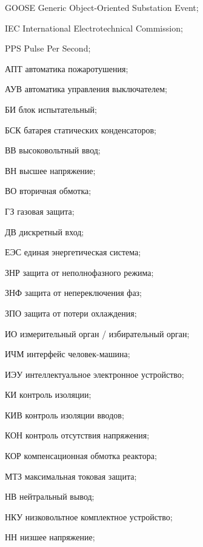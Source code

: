 \begin{list}{}%
{%
  \setlength{\labelwidth}{\abbrwidth}%
  \setlength{\labelsep}{0pt}%
  \setlength{\leftmargin}{\dimexpr\labelwidth+\labelsep\relax}%
  \setlength{\itemindent}{0pt}%
  \setlength{\parsep}{0pt}%
  \setlength{\itemsep}{0pt}
  \renewcommand{\makelabel}[1]{#1 --\hspace{\abbrgap}}%
}
\item[GOOSE] Generic Object-Oriented Substation Event;
\item[IEC]  International Electrotechnical Commission;
\item[PPS] Pulse Per Second;
\item[АПТ] автоматика пожаротушения;
\item[АУВ] автоматика управления выключателем;
\item[БИ] блок испытательный;
\item[БСК] батарея статических конденсаторов;
\item[ВВ] высоковольтный ввод;
\item[ВН] высшее напряжение;
\item[ВО] вторичная обмотка;
\item[ГЗ] газовая защита;
\item[ДВ] дискретный вход;
\item[ЕЭС] единая энергетическая система;
\item[ЗНР] защита от неполнофазного режима;
\item[ЗНФ] защита от непереключения фаз;
\item[ЗПО] защита от потери охлаждения;
\item[ИО] измерительный орган / избирательный орган;
\item[ИЧМ] интерфейс человек-машина;
\item[ИЭУ] интеллектуальное электронное устройство;
\item[КИ] контроль изоляции;
\item[КИВ] контроль изоляции вводов;
\item[КОН] контроль отсутствия напряжения;
\item[КОР] компенсационная обмотка реактора;
\item[МТЗ] максимальная токовая защита;
\item[НВ] нейтральный вывод;
\item[НКУ] низковольтное комплектное устройство;
\item[НН] низшее напряжение;

\end{list}
